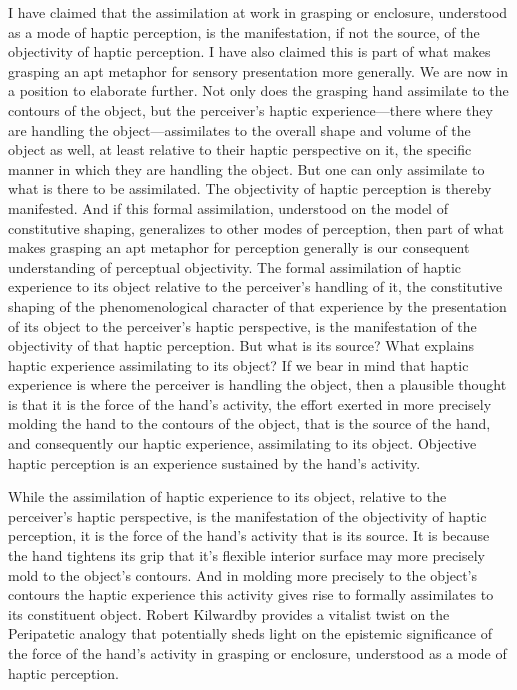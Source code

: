 I have claimed that the assimilation at work in grasping or enclosure, understood as a mode of haptic perception, is the manifestation, if not the source, of the objectivity of haptic perception. I have also claimed this is part of what makes grasping an apt metaphor for sensory presentation more generally. We are now in a position to elaborate further. Not only does the grasping hand assimilate to the contours of the object, but the perceiver's haptic experience---there where they are handling the object---assimilates to the overall shape and volume of the object as well, at least relative to their haptic perspective on it, the specific manner in which they are handling the object. But one can only assimilate to what is there to be assimilated. The objectivity of haptic perception is thereby manifested. And if this formal assimilation, understood on the model of constitutive shaping, generalizes to other modes of perception, then part of what makes grasping an apt metaphor for perception generally is our consequent understanding of perceptual objectivity. The formal assimilation of haptic experience to its object relative to the perceiver's handling of it, the constitutive shaping of the phenomenological character of that experience by the presentation of its object to the perceiver's haptic perspective, is the manifestation of the objectivity of that haptic perception. But what is its source? What explains haptic experience assimilating to its object? If we bear in mind that haptic experience is where the perceiver is handling the object, then a plausible thought is that it is the force of the hand's activity, the effort exerted in more precisely molding the hand to the contours of the object, that is the source of the hand, and consequently our haptic experience, assimilating to its object. Objective haptic perception is an experience sustained by the hand's activity.

While the assimilation of haptic experience to its object, relative to the perceiver's haptic perspective, is the manifestation of the objectivity of haptic perception, it is the force of the hand's activity that is its source. It is because the hand tightens its grip that it's flexible interior surface may more precisely mold to the object's contours. And in molding more precisely to the object's contours the haptic experience this activity gives rise to formally assimilates to its constituent object. Robert Kilwardby provides a vitalist twist on the Peripatetic analogy that potentially sheds light on the epistemic significance of the force of the hand's activity in grasping or enclosure, understood as a mode of haptic perception. 

